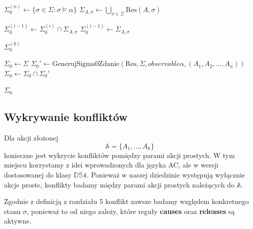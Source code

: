 \documentclass[11pt,a4paper]{article}
\theoremstyle{definition}
\begin{document}
\begin{algorithm}[H]
\caption{Pseudokod dla algorytmu wyznaczającego stany początkowe}
\label{alg:generuj-sigma0}
\begin{algorithmic}[1]
        \State $\Sigma_0^{(n)} \gets \{ \sigma \in \Sigma : \sigma \models \alpha \}$
            \State $\Sigma_{A,\sigma} \gets \bigcup_{\sigma \in \Sigma}\mathrm{Res}(A, \sigma)$
            
                    \State $\Sigma_0^{(i-1)} \gets \Sigma_0^{(i)} \cap \Sigma_{A,\sigma}$
                \EndIf
            \Else
                    \State $\Sigma_0^{(i-1)} \gets \Sigma_{A,\sigma}$
                \EndIf
            \EndIf
        \EndFor    

        \Return $\Sigma_0^{(0)}$
    \EndProcedure
    
        \State $\Sigma_0 \gets \Sigma$
            \State $\Sigma_0' \gets \mathrm{GenerujSigma0Zdanie}(\mathrm{Res}, \Sigma, observable \alpha, (A_1, A_2, \dots, A_n))$
            \State $\Sigma_0 \gets \Sigma_0 \cap \Sigma_0'$
        \EndFor

        \Return $\Sigma_0$
    \EndProcedure
\end{algorithmic}
\end{algorithm}

\subsection{Wykrywanie konfliktów}
\label{sec:alg-konflikty}

Dla akcji złożonej
\[
\mathbb{A} = \{A_1,\ldots,A_k\}
\]
konieczne jest wykrycie konfliktów pomiędzy parami akcji prostych. W tym miejscu korzystamy z idei wprowadzonych dla języka AC, ale w wersji dostosowanej do klasy $\mathbb{DS4}$. Ponieważ w naszej dziedzinie występują wyłącznie akcje proste, konflikty badamy między parami akcji prostych należących do $\mathbb{A}$.

Zgodnie z definicją z rozdziału 5 konflikt zawsze badamy względem konkretnego stanu $\sigma$, ponieważ to od niego zależy, które reguły \textbf{causes} oraz \textbf{releases} są aktywne.
\end{document}
